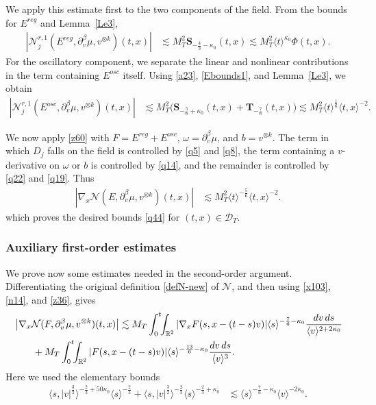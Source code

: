 \documentclass[reqno,11pt]{amsart}
\numberwithin{equation}{section}
\begin{document}
We apply this estimate first to the two components of the field. From the
bounds for $E^{reg}$ and Lemma~\ref{Le3},
\begin{align}
\left|\mathcal N_j^{r,1}
(E^{reg},\partial_v^\beta\mu,v^{\otimes k})(t,x)\right|
&\lesssim M_T^2\mathbf S_{-\frac43-\kappa_0}(t,x)\lesssim
M_T^2\langle t\rangle^{\kappa_0}\Phi(t,x).
\label{q22}
\end{align}
For the oscillatory component, we separate the linear and nonlinear
contributions in the term containing $E^{osc}$ itself. Using
\eqref{a23}, \eqref{Ebounds1}, and Lemma~\ref{Le3}, we obtain
\begin{align}
\left|\mathcal N_j^{r,1}
(E^{osc},\partial_v^\beta\mu,v^{\otimes k})(t,x)\right|
&\lesssim M_T^2\big(
\mathbf S_{-\frac56+\kappa_0}(t,x)
+\mathbf T_{-\frac76}(t,x)
\big)\lesssim M_T^2\langle t\rangle^{\frac16}\langle t,x\rangle^{-2}.
\label{q19}
\end{align}


We now apply \eqref{z60} with $F=E^{reg}+E^{osc}$,
$\omega=\partial_v^\beta\mu$, and $b=v^{\otimes k}$. The term in which
$D_j$ falls on the field is controlled by \eqref{q5} and \eqref{q8}, the
term containing a $v$-derivative on $\omega$ or $b$ is controlled by
\eqref{q14}, and the remainder is controlled by \eqref{q22} and
\eqref{q19}. Thus
\begin{align}
\left|\nabla_x\mathcal N
(E,\partial_v^\beta\mu,v^{\otimes k})(t,x)\right|
&\lesssim
M_T^2\langle t\rangle^{-\frac56}\langle t,x\rangle^{-2}.
\label{q15}
\end{align}
which proves the desired bounds \eqref{q44} for $(t,x)\in\mathcal D_T$.

\subsubsection{Auxiliary first-order estimates}
We prove now some estimates needed in the second-order argument.
Differentiating the original definition \eqref{defN-new} of $\mathcal N$, and then using
\eqref{x103}, \eqref{n14}, and \eqref{z36}, gives
\begin{align}
&\left|\nabla_x\mathcal N
(F,\partial_v^\beta\mu,v^{\otimes k})(t,x)\right|\lesssim
M_T\int_0^t\!\!\int_{\mathbb R^2}
|\nabla_xF(s,x-(t-s)v)|
\langle s\rangle^{-\frac76-\kappa_0}
\frac{dv\,ds}{\langle v\rangle^{2+2\kappa_0}}
\notag\\
&\qquad+
M_T\int_0^t\!\!\int_{\mathbb R^2}
|F(s,x-(t-s)v)|
\langle s\rangle^{-\frac{13}{6}-\kappa_0}
\frac{dv\,ds}{\langle v\rangle^3}.
\label{q12}
\end{align}
Here we used the elementary bounds
\begin{align*}
\langle s,|v|^{\frac32}\rangle^{-\frac23+50\kappa_0}
\langle s\rangle^{-\frac23}
+\langle s,|v|^{\frac32}\rangle^{-\frac23}
\langle s\rangle^{-\frac23+\kappa_0}
&\lesssim\langle s\rangle^{-\frac76-\kappa_0}
\langle v\rangle^{-2\kappa_0}.
\end{align*}
\end{document}
